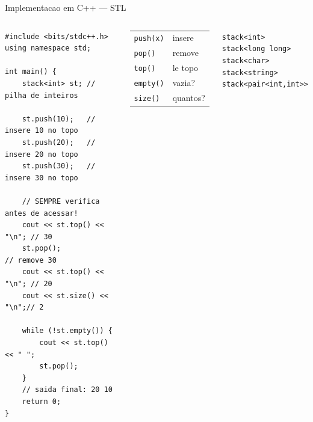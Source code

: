 \documentclass[aspectratio=169,11pt]{beamer}
\begin{document}
\begin{frame}[fragile,shrink=8]{Implementacao em C++ --- STL}
  \begin{columns}[t]
      \begin{tcolorbox}[caixaCodigo]
        \begin{lstlisting}[style=cppcompact]
#include <bits/stdc++.h>
using namespace std;

int main() {
    stack<int> st; // pilha de inteiros

    st.push(10);   // insere 10 no topo
    st.push(20);   // insere 20 no topo
    st.push(30);   // insere 30 no topo

    // SEMPRE verifica antes de acessar!
    cout << st.top() << "\n"; // 30
    st.pop();                 // remove 30
    cout << st.top() << "\n"; // 20
    cout << st.size() << "\n";// 2

    while (!st.empty()) {
        cout << st.top() << " ";
        st.pop();
    }
    // saida final: 20 10
    return 0;
}
        \end{lstlisting}
      \end{tcolorbox}
      \begin{tcolorbox}[caixaAzul,title={Resumo STL}]
        \footnotesize
        \begin{tabular}{@{}ll@{}}
          \texttt{push(x)} & insere\\[3pt]
          \texttt{pop()}   & remove\\[3pt]
          \texttt{top()}   & le topo\\[3pt]
          \texttt{empty()} & vazia?\\[3pt]
          \texttt{size()}  & quantos?\\
        \end{tabular}
      \end{tcolorbox}
      \vspace{0.18cm}
      \begin{tcolorbox}[caixaVermelho,title={Tipos possiveis}]
        \footnotesize
        \texttt{stack<int>}\\
        \texttt{stack<long long>}\\
        \texttt{stack<char>}\\
        \texttt{stack<string>}\\
        \texttt{stack<pair<int,int>>}
      \end{tcolorbox}
  \end{columns}
\end{frame}
\end{document}
